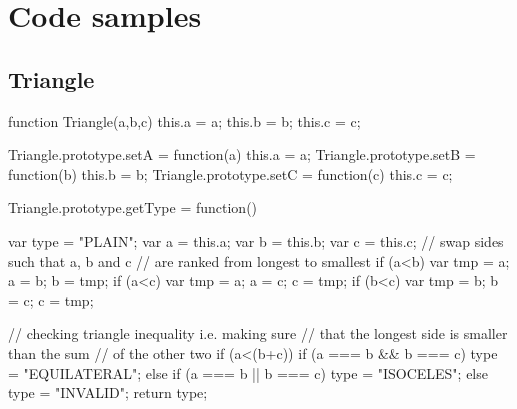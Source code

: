 \appendix
\chapter{Code samples}
\section{Triangle}
\label{triangle}

\begin{code}
function Triangle(a,b,c) {
    this.a = a;
    this.b = b;
    this.c = c;
}

Triangle.prototype.setA = function(a) {
    this.a = a;
}
Triangle.prototype.setB = function(b) {
    this.b = b;
}
Triangle.prototype.setC = function(c) {
    this.c = c;
}
\end{code}

\begin{code}
Triangle.prototype.getType = function() {    
    var type = "PLAIN";
    var a = this.a;
    var b = this.b;
    var c = this.c;
    // swap sides such that a, b and c
    // are ranked from longest to smallest
    if (a<b) {
        var tmp = a;
        a = b;
        b = tmp;
    }
    if (a<c) {
        var tmp = a;
        a = c;
        c = tmp;
    }
    if (b<c) {
        var tmp = b;
        b = c;
        c = tmp;
    }

    // checking triangle inequality i.e. making sure
    // that the longest side is smaller than the sum
    // of the other two
    if (a<(b+c)) {
        if (a === b && b === c) type = "EQUILATERAL";
        else if (a === b || b === c) type = "ISOCELES";
    }
    else {
        type = "INVALID";
    }
    return type;
}   
\end{code}